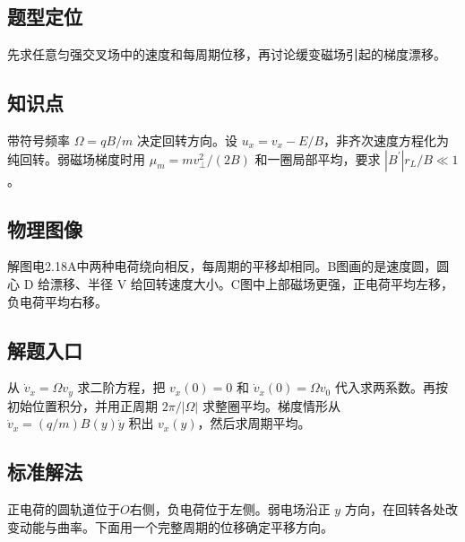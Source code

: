 \documentclass[UTF8,fontset=fandol,a4paper,11pt]{ctexart}
\begin{document}
\subsection*{题型定位}

先求任意匀强交叉场中的速度和每周期位移，再讨论缓变磁场引起的梯度漂移。



\subsection*{知识点}

带符号频率 $\Omega=qB/m$ 决定回转方向。设 $u_x=v_x-E/B$，非齐次速度方程化为纯回转。弱磁场梯度时用 $\mu_m=mv_\perp^2/(2B)$ 和一圈局部平均，要求 $|B^\prime|r_L/B\ll1$。



\subsection*{物理图像}

解图电2.18A中两种电荷绕向相反，每周期的平移却相同。B图画的是速度圆，圆心 D 给漂移、半径 V 给回转速度大小。C图中上部磁场更强，正电荷平均左移，负电荷平均右移。



\subsection*{解题入口}

从 $\dot v_x=\Omega v_y$ 求二阶方程，把 $v_x(0)=0$ 和 $\dot v_x(0)=\Omega v_0$ 代入求两系数。再按初始位置积分，并用正周期 $2\pi/|\Omega|$ 求整圈平均。梯度情形从 $\dot v_x=(q/m)B(y)\dot y$ 积出 $v_x(y)$，然后求周期平均。


\subsection*{标准解法}

正电荷的圆轨道位于$O$右侧，负电荷位于左侧。弱电场沿正 $y$ 方向，在回转各处改变动能与曲率。下面用一个完整周期的位移确定平移方向。
\end{document}
